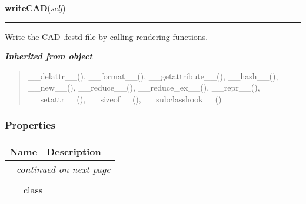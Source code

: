     \vspace{0.5ex}

\hspace{.8\funcindent}\begin{boxedminipage}{\funcwidth}

    \raggedright \textbf{writeCAD}(\textit{self})

    \vspace{-1.5ex}

    \rule{\textwidth}{0.5\fboxrule}
\setlength{\parskip}{2ex}
    Write the CAD .fcstd file by calling rendering functions.

\setlength{\parskip}{1ex}
    \end{boxedminipage}


\large{\textbf{\textit{Inherited from object}}}

\begin{quote}
\_\_delattr\_\_(), \_\_format\_\_(), \_\_getattribute\_\_(), \_\_hash\_\_(), \_\_new\_\_(), \_\_reduce\_\_(), \_\_reduce\_ex\_\_(), \_\_repr\_\_(), \_\_setattr\_\_(), \_\_sizeof\_\_(), \_\_subclasshook\_\_()
\end{quote}


  \subsubsection{Properties}

    \vspace{-1cm}
\hspace{\varindent}\begin{longtable}{|p{\varnamewidth}|p{\vardescrwidth}|l}
\cline{1-2}
\cline{1-2} \centering \textbf{Name} & \centering \textbf{Description}& \\
\cline{1-2}
\endhead\cline{1-2}\multicolumn{3}{r}{\small\textit{continued on next page}}\\\endfoot\cline{1-2}
\endlastfoot\multicolumn{2}{|l|}{\textit{Inherited from object}}\\
\multicolumn{2}{|p{\varwidth}|}{\raggedright \_\_class\_\_}\\
\cline{1-2}
\end{longtable}

